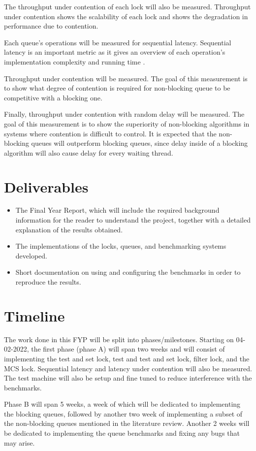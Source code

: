 \documentclass[a4paper, 12pt, titlepage]{article}
\begin{document}
\begin{singlespace}
The throughput under contention of each lock will also be measured. Throughput under contention shows the scalability of each lock and shows the degradation in performance due to contention.

Each queue's operations will be measured for sequential latency. Sequential latency is an important metric as it gives an overview of each operation's implementation complexity and running time \cite{valois1995lock}. 

Throughput under contention will be measured. The goal of this measurement is to show what degree of contention is required for non-blocking queue to be competitive with a blocking one. 

Finally, throughput under contention with random delay will be measured. The goal of this measurement is to show the superiority of non-blocking algorithms in systems where contention is difficult to control. It is expected that the non-blocking queues will outperform blocking queues, since delay inside of a blocking algorithm will also cause delay for every waiting thread. 
\section{Deliverables}
\begin{itemize}
  \item The Final Year Report, which will include the required background information for the reader to understand the project, together with a detailed explanation of the results obtained.
  \item The implementations of the locks, queues, and benchmarking systems developed. 
  \item Short documentation on using and configuring the benchmarks in order to reproduce the results.
\end{itemize}

\section{Timeline}
The work done in this FYP will be split into phases/milestones. Starting on 04-02-2022, the first phase (phase A) will span two weeks and will consist of implementing the test and set lock, test and test and set lock, filter lock, and the MCS lock. Sequential latency and latency under contention will also be measured. The test machine will also be setup and fine tuned to reduce interference with the benchmarks. 

Phase B will span 5 weeks, a week of which will be dedicated to implementing the blocking queues, followed by another two week of implementing a subset of the non-blocking queues mentioned in the literature review. Another 2 weeks will be dedicated to implementing the queue benchmarks and fixing any bugs that may arise.


\end{singlespace}
\end{document}
